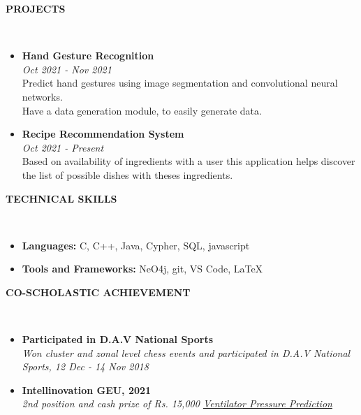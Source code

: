 \documentclass[a4paper,10pt]{article}
\newcommand{\lsep}{-0.5cm}
\newcommand{\resheading}[1]{{\small \colorbox{mygrey}{\begin{minipage}{0.975\textwidth}{\textbf{#1 \vphantom{p\^{E}}}}\end{minipage}}}}
\begin{document}
\resheading{\textbf{PROJECTS} }\\[\lsep]
\begin{itemize}
    \setlength\itemsep{0em}
    \item \noindent \textbf{Hand Gesture Recognition} \\
          \textit{Oct 2021 - Nov 2021} \\
          Predict hand gestures using image segmentation and convolutional neural networks. \\
          Have a data generation module, to easily generate data.
    \item \noindent \textbf{Recipe Recommendation System} \\
          \textit{Oct 2021 - Present} \\
          Based on availability of ingredients with a user this application
          helps discover the list of possible dishes with theses ingredients.
\end{itemize}

\resheading{\textbf{TECHNICAL SKILLS} }\\[\lsep]
\begin{itemize}
    \setlength\itemsep{0em}
    \item \noindent \textbf{Languages:} C, C++, Java, Cypher, SQL, javascript
    \item \noindent \textbf{Tools and Frameworks:} NeO4j, git, VS Code, \LaTeX
\end{itemize}

\resheading{\textbf{CO-SCHOLASTIC ACHIEVEMENT} }\\[\lsep]
\begin{itemize}
    \setlength\itemsep{0em}
    \item \noindent \textbf{Participated in D.A.V National Sports} \\
          \textit{Won cluster and zonal level chess events and participated in D.A.V National Sports, 12 Dec - 14 Nov 2018}
    \item \noindent \textbf{Intellinovation GEU, 2021} \\
          \textit{2nd position and cash prize of Rs. 15,000 \href{https://www.github.com/Bot-7037/Ventilator-Pressure-Prediction}{Ventilator Pressure Prediction}}
\end{itemize}
\end{document}
